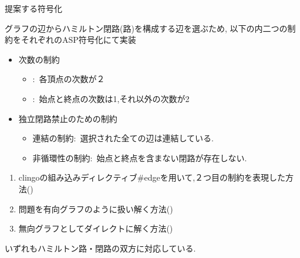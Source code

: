 \documentclass[dvipdfmx,11pt]{beamer}
\begin{document}
\begin{frame}[fragile]{提案する符号化}
  \begin{block}{}
    グラフの辺からハミルトン閉路(路)を構成する辺を選ぶため,
    以下の内二つの制約をそれぞれのASP符号化にて実装
    \begin{itemize}
    \item \small{\alert{次数の制約}}
      \begin{itemize}
      \item \small{:\ 各頂点の次数が２}
      \item \small{:\ 始点と終点の次数は1,それ以外の次数が2}
      \end{itemize}
    \item \small{独立閉路禁止のための制約}
      \begin{itemize}
      \item \small{\alert{連結の制約}:\ 選択された全ての辺は連結している.}
      \item \small{\alert{非循環性の制約}:\ 始点と終点を含まない閉路が存在しない.}
      \end{itemize}
    \end{itemize}
  \end{block}
  \begin{enumerate}
  \item clingoの組み込みディレクティブ\#edgeを用いて,２つ目の制約を表現した方法()
  \item 問題を有向グラフのように扱い解く方法()\\
  \item 無向グラフとしてダイレクトに解く方法()\\
  \end{enumerate}
  いずれもハミルトン路・閉路の双方に対応している.
\end{frame}
\newcommand{\grid}[2]{
    \draw (#1,#2) [fill=blue!20] circle[radius=0.5] node[at={(#1,#2)}]{1};
    \draw (#1,#2) circle[radius=0.5,shift={(1.5,0)}] node[at={(#1,#2)},shift={(1.5,0)}]{2};
    \draw (#1,#2) circle[radius=0.5,shift={(3.0,0)}] node[at={(#1,#2)},shift={(3.0,0)}]{3};
    \draw (#1,#2) circle[radius=0.5,shift={(0,-1.5)}] node[at={(#1,#2)},shift={(0,-1.5)}]{4};
    \draw (#1,#2) circle[radius=0.5,shift={(1.5,-1.5)}] node[at={(#1,#2)},shift={(1.5,-1.5)}]{5};
    \draw (#1,#2) circle[radius=0.5,shift={(3.0,-1.5)}] node[at={(#1,#2)},shift={(3.0,-1.5)}]{6};
    \draw (#1,#2) circle[radius=0.5,shift={(0,-3)}] node[at={(#1,#2)},shift={(0,-3)}]{7};
    \draw (#1,#2) circle[radius=0.5,shift={(1.5,-3)}] node[at={(#1,#2)},shift={(1.5,-3)}]{8};
    \draw (#1,#2) [fill=red!20] circle[radius=0.5,shift={(3.0,-3)}] node[at={(#1,#2)},shift={(3.0,-3)}]{9};
}
\end{document}
